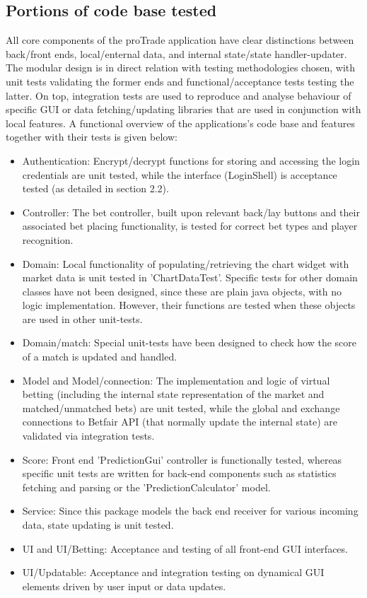 \documentclass[10pt]{article}
\begin{document}
\subsection{Portions of code base tested}

All core components of the proTrade application have clear distinctions between back/front ends, local/enternal data, and internal state/state handler-updater. The modular design is in direct relation with testing methodologies chosen, with unit tests validating the former ends and functional/acceptance tests testing the latter. On top, integration tests are used to reproduce and analyse behaviour of specific GUI or data fetching/updating libraries that are used in conjunction with local features. A functional overview of the applications's code base and features together with their tests is given below:

\begin{itemize}
\renewcommand{\labelitemi}{$\bullet$}
\item Authentication: Encrypt/decrypt functions for storing and accessing the login credentials are unit tested, while the interface (LoginShell) is acceptance tested (as detailed in section 2.2).
\item Controller: The bet controller, built upon relevant back/lay buttons and their associated bet placing functionality, is tested for correct bet types and player recognition.
\item Domain: Local functionality of populating/retrieving the chart widget with market data is unit tested in 'ChartDataTest'. Specific tests for other domain classes have not been designed, since these are plain java objects, with no logic implementation. However, their functions are tested when these objects are used in other unit-tests.
\item Domain/match: Special unit-tests have been designed to check how the score of a match is updated and handled.
\item Model and Model/connection: The implementation and logic of virtual betting (including the internal state representation of the market and matched/unmatched bets) are unit tested, while the global and exchange connections to Betfair API (that normally update the internal state) are validated via integration tests.     
\item Score: Front end 'PredictionGui' controller is functionally tested, whereas specific unit tests are written for back-end components such as statistics fetching and parsing or the 'PredictionCalculator' model. 
\item Service: Since this package models the back end receiver for various incoming data, state updating is unit tested.
\item UI and UI/Betting: Acceptance and testing of all front-end GUI interfaces.
\item UI/Updatable: Acceptance and integration testing on dynamical GUI elements driven by user input or data updates.
\end{itemize}
\end{document}
